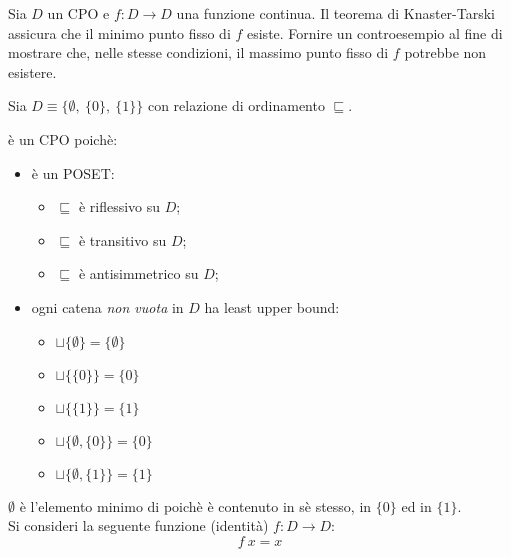 \newcommand{\lt}{\ensuremath{\sqsubseteq}}

{
  Sia $D$ un CPO e $f: D \to D$ una funzione continua. Il teorema di
  Knaster-Tarski assicura che il minimo punto fisso di $f$ esiste.
  Fornire un controesempio al fine di mostrare che, nelle stesse condizioni, il
  massimo punto fisso di $f$ potrebbe non esistere.
}
{
}

Sia $D \equiv \{\emptyset,\ \{0\},\ \{1\}\}$ con relazione di ordinamento
$\sqsubseteq$.

 è un CPO poichè:
\begin{itemize}
  \item {} è un POSET:
  \begin{itemize}
    \item $\sqsubseteq$ è riflessivo su $D$;
    \item $\sqsubseteq$ è transitivo su $D$;
    \item $\sqsubseteq$ è antisimmetrico su $D$;
  \end{itemize}
  \item ogni catena \emph{non vuota} in $D$ ha least upper bound:
  \begin{itemize}
    \item $\sqcup\{\emptyset\} = \{\emptyset\}$
    \item $\sqcup\{\{0\}\} = \{0\}$
    \item $\sqcup\{\{1\}\} = \{1\}$
    \item $\sqcup\{\emptyset, \{0\}\} = \{0\}$
    \item $\sqcup\{\emptyset, \{1\}\} = \{1\}$
  \end{itemize}
\end{itemize}

$\emptyset$ è l'elemento minimo di  poichè
è contenuto in sè stesso, in $\{0\}$ ed in $\{1\}$.
\\
Si consideri la seguente funzione (identità) $f: D \to D$:
$$
f\ x = x
$$

